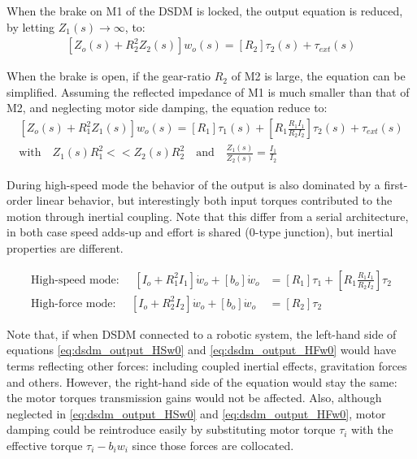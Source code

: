 When the brake on M1 of the DSDM is locked, the output equation is reduced, by letting $Z_1(s) \rightarrow \infty$, to:
\begin{align}
\left[
 Z_o(s)  + R_2^2 Z_2(s)
\right] w_o(s) = 
\left[
R_2
\right] \tau_2(s)  + 
\tau_{ext}(s)
\label{eq:dsdm_output_HF}
\end{align}

When the brake is open, if the gear-ratio $R_2$ of M2 is large, the equation can be simplified. 
%
%
Assuming the reflected impedance of M1 is much smaller than that of M2, and neglecting motor side damping, the equation reduce to:
\begin{align}
\left[
Z_o(s)  + R_1^2 Z_1(s)
\right] w_o(s) = 
\left[
R_1
\right] \tau_1(s)  + 
\left[
R_1 \frac{R_1 I_1}{R_2 I_2}
\right] \tau_2(s)  + 
\tau_{ext}(s) \\
\text{with} \quad Z_1(s) R_1^2 << Z_2(s) R_2^2 
\quad \text{and} \quad \frac{Z_1(s)}{Z_2(s)} = \frac{I_1}{I_2}
\label{eq:dsdm_output_HS}
\end{align}

During high-speed mode the behavior of the output is also dominated by a first-order linear behavior, but interestingly both input torques contributed to the motion through inertial coupling. Note that this differ from a serial architecture, in both case speed adds-up and effort is shared (0-type junction), but inertial properties are different.

\begin{align}
\text{High-speed mode: } \quad \left[ I_o + R_1^2 I_1 \right] \dot{w}_o +  \left[ b_o \right] \dot{w}_o  &= \left[ R_1 \right] \tau_1 + \left[ R_1 \frac{R_1 I_1}{R_2 I_2} \right] \tau_2 
\label{eq:dsdm_output_HSw0} \\
\text{High-force mode: } \quad \left[ I_o + R_2^2 I_2 \right] \dot{w}_o +  \left[ b_o \right] \dot{w}_o  &= \left[ R_2 \right] \tau_2 
\label{eq:dsdm_output_HFw0}
\end{align}

Note that, if when DSDM connected to a robotic system, the left-hand side of equations \eqref{eq:dsdm_output_HSw0} and \eqref{eq:dsdm_output_HFw0} would have terms reflecting other forces: including coupled inertial effects, gravitation forces and others. However, the right-hand side of the equation would stay the same: the motor torques transmission gains would not be affected. Also, although neglected in \eqref{eq:dsdm_output_HSw0} and \eqref{eq:dsdm_output_HFw0}, motor damping could be reintroduce easily by substituting motor torque $\tau_i$ with the effective torque $\tau_i - b_i w_i$ since those forces are collocated. 

